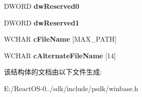 \begin{DoxyCompactItemize}
D\+W\+O\+RD {\bfseries dw\+Reserved0}
\item 
\mbox{\label{struct___w_i_n32___f_i_n_d___d_a_t_a_w_a50f62e53c9f42824804ed0ff5d154167}} 
D\+W\+O\+RD {\bfseries dw\+Reserved1}
\item 
\mbox{\label{struct___w_i_n32___f_i_n_d___d_a_t_a_w_a3dce1fa43fc6b84aeba4d37537a6168b}} 
W\+C\+H\+AR {\bfseries c\+File\+Name} \mbox{[}M\+A\+X\+\_\+\+P\+A\+TH\mbox{]}
\item 
\mbox{\label{struct___w_i_n32___f_i_n_d___d_a_t_a_w_ae76d614164c6c25c90828d43a9561fbf}} 
W\+C\+H\+AR {\bfseries c\+Alternate\+File\+Name} \mbox{[}14\mbox{]}
\end{DoxyCompactItemize}


该结构体的文档由以下文件生成\+:\begin{DoxyCompactItemize}
\item 
E\+:/\+React\+O\+S-\/0../sdk/include/psdk/winbase.\+h\end{DoxyCompactItemize}
